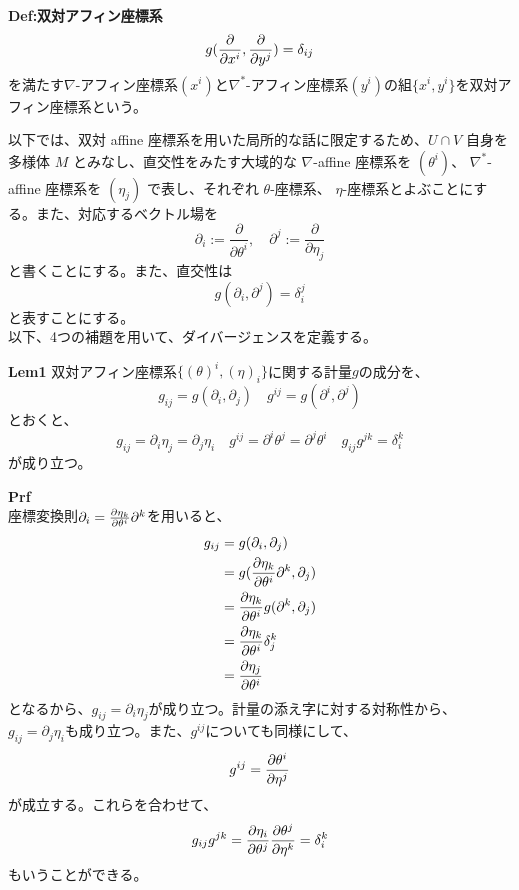 \documentclass[a4paper,11pt]{jsarticle}
\numberwithin{equation}{section}
\begin{document}
\begin{itembox}[l]{\textbf{Def:双対アフィン座標系}}
    \begin{equation}
        g(\pdv{x^i},\pdv{y^j}) = \delta_{ij}
    \end{equation}
    を満たす$\nabla$-アフィン座標系$(x^i)$と$\nabla^*$-アフィン座標系$(y^i)$の組$\{x^i,y^i\}$を双対アフィン座標系という。
\end{itembox}

以下では、双対 affine 座標系を用いた局所的な話に限定するため、\( U \cap V \) 自身を多様体 \( M \) とみなし、直交性をみたす大域的な \( \nabla \)-affine 座標系を \((\theta^i)\)、 \( \nabla^*\)-affine 座標系を \((\eta_j)\) で表し、それぞれ \(\theta\)-座標系、 \(\eta\)-座標系とよぶことにする。また、対応するベクトル場を
\begin{equation}
\partial_i := \frac{\partial}{\partial \theta^i}, \quad \partial^j := \frac{\partial}{\partial \eta_j} \tag{4.40}
\end{equation}
と書くことにする。また、直交性は
\begin{equation}
g(\partial_i, \partial^j) = \delta_i^j 
\end{equation}
と表すことにする。\\
以下、4つの補題を用いて、ダイバージェンスを定義する。

\begin{itembox}[l]{\textbf{Lem1}}
    双対アフィン座標系$\{(\theta)^i,(\eta)_i\}$に関する計量$g$の成分を、
    \begin{equation}
        g_{ij} = g(\partial_i,\partial_j) \quad g^{ij} = g(\partial^i,\partial^j)
    \end{equation}
    とおくと、
    \begin{equation}
        g_{ij} = \partial_i \eta_j = \partial_j \eta_i \quad g^{ij} = \partial^i \theta^j = \partial^j \theta^i \quad g_{ij}g^{jk} = \delta_i^k
    \end{equation}
    が成り立つ。
\end{itembox}
\textbf{Prf}\\
座標変換則$\partial_i = \pdv{\eta_k}{\theta^i}\partial^k$を用いると、
\begin{align}
    g_{ij} &= g(\partial_i,\partial_j) \\
    &= g(\pdv{\eta_k}{\theta^i}\partial^k,\partial_j) \\
    &= \pdv{\eta_k}{\theta^i}g(\partial^k,\partial_j) \\
    &= \pdv{\eta_k}{\theta^i}\delta_j^k \\
    &= \pdv{\eta_j}{\theta^i}
\end{align}
となるから、$g_{ij} = \partial_i \eta_j$が成り立つ。計量の添え字に対する対称性から、$g_{ij} = \partial_j \eta_i$も成り立つ。また、$g^{ij}$についても同様にして、
\begin{align}
    g^{ij} = \pdv{\theta ^i}{\eta^j}
\end{align}
が成立する。これらを合わせて、
\begin{align}
    g_{ij}g^{jk} = \pdv{\eta_i}{\theta^j}\pdv{\theta^j}{\eta^k} = \delta_i^k
\end{align}
もいうことができる。\hfill\qedsymbol
\end{document}

